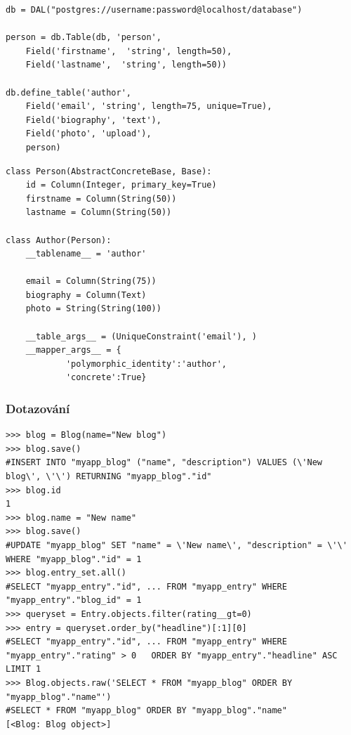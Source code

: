 \documentclass[ing,male,java,dept456]{diploma}						%
\begin{document}
\begin{lstlisting}[style=custompython, label=src:light-w2p-mapping, caption=Ukázka mapování ve web2py DBAL]
db = DAL("postgres://username:password@localhost/database")

person = db.Table(db, 'person',
    Field('firstname',  'string', length=50),
    Field('lastname',  'string', length=50))

db.define_table('author', 
    Field('email', 'string', length=75, unique=True), 
    Field('biography', 'text'),
    Field('photo', 'upload'),
    person)
\end{lstlisting}

\begin{lstlisting}[style=custompython, label=src:light-sqla-mapping, caption={Ukázka mapování v SQLAlchemy}]
class Person(AbstractConcreteBase, Base):
    id = Column(Integer, primary_key=True)
    firstname = Column(String(50))
    lastname = Column(String(50))

class Author(Person):
    __tablename__ = 'author'

    email = Column(String(75))
    biography = Column(Text)
    photo = String(String(100))

    __table_args__ = (UniqueConstraint('email'), )
    __mapper_args__ = {
			'polymorphic_identity':'author',
			'concrete':True}
\end{lstlisting}
\clearpage

\subsubsection{Dotazování}
\label{subsubsec:Query}
\begin{lstlisting}[style=custompython, label=src:dj-query, caption={Ukázka práce s daty v Django ORM}]
>>> blog = Blog(name="New blog")
>>> blog.save()
#INSERT INTO "myapp_blog" ("name", "description") VALUES (\'New blog\', \'\') RETURNING "myapp_blog"."id"
>>> blog.id
1
>>> blog.name = "New name"
>>> blog.save()
#UPDATE "myapp_blog" SET "name" = \'New name\', "description" = \'\' WHERE "myapp_blog"."id" = 1 
>>> blog.entry_set.all()
#SELECT "myapp_entry"."id", ... FROM "myapp_entry" WHERE "myapp_entry"."blog_id" = 1
>>> queryset = Entry.objects.filter(rating__gt=0)
>>> entry = queryset.order_by("headline")[:1][0]
#SELECT "myapp_entry"."id", ... FROM "myapp_entry" WHERE "myapp_entry"."rating" > 0   ORDER BY "myapp_entry"."headline" ASC LIMIT 1
>>> Blog.objects.raw('SELECT * FROM "myapp_blog" ORDER BY "myapp_blog"."name"')
#SELECT * FROM "myapp_blog" ORDER BY "myapp_blog"."name"
[<Blog: Blog object>]
\end{lstlisting}
\end{document}

